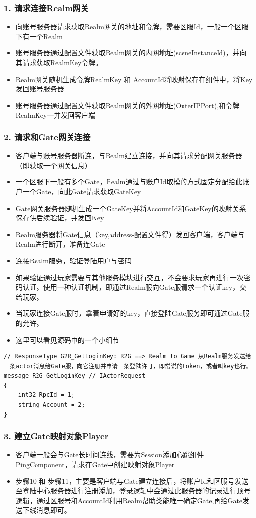 \documentclass[9pt, b5paper]{article}
\begin{document}
\subsubsection{1. 请求连接Realm网关}
\label{sec-3-2-1}
\begin{itemize}
\item 向账号服务器请求获取Realm网关的地址和令牌，需要区服Id，一般一个区服下有一个Realm
\item 账号服务器通过配置文件获取Realm网关的内网地址(sceneInstanceId)，并向其请求获取RealmKey令牌。
\item Realm网关随机生成令牌RealmKey 和 AccountId将映射保存在组件中，将Key发回账号服务器
\item 账号服务器通过配置文件获取Realm网关的外网地址(OuterIPPort),和令牌RealmKey一并发回客户端
\end{itemize}
\subsubsection{2. 请求和Gate网关连接}
\label{sec-3-2-2}
\begin{itemize}
\item 客户端与账号服务器断连，与Realm建立连接，并向其请求分配网关服务器（即获取一个网关信息）
\item 一个区服下一般有多个Gate，Realm通过与账户Id取模的方式固定分配给此账户一个Gate，向此Gate请求获取GateKey
\item Gate网关服务器随机生成一个GateKey并将AccountId和GateKey的映射关系保存供后续验证，并发回Key
\item Realm服务器将Gate信息（key,address-配置文件得）发回客户端，客户端与Realm进行断开，准备连Gate
\item 连接Realm服务，验证登陆用户与密码
\item 如果验证通过玩家需要与其他服务模块进行交互，不会要求玩家再进行一次密码认证。使用一种认证机制，即通过Realm服向Gate服请求一个认证key，交给玩家。
\item 当玩家连接Gate服时，拿着申请好的key，直接登陆Gate服务即可通过Gate服的允许。
\item 这里可以看见源码中的一个小细节
\end{itemize}
\begin{verbatim}
// ResponseType G2R_GetLoginKey: R2G ==> Realm to Game 从Realm服务发送给一条actor消息给Gate服，向它注册并申请一条登陆许可，即常说的token，或者叫key也行。
message R2G_GetLoginKey // IActorRequest
{
    int32 RpcId = 1;
    string Account = 2;
}
\end{verbatim}
\subsubsection{3. 建立Gate映射对象Player}
\label{sec-3-2-3}
\begin{itemize}
\item 客户端一般会与Gate长时间连线，需要为Session添加心跳组件PingComponent，请求在Gate中创建映射对象Player
\item 步骤10 和 步骤11，主要是客户端与Gate建立连接后，将账户Id和区服号发送至登陆中心服务器进行注册添加，登录逻辑中会通过此服务器的记录进行顶号逻辑，通过区服号和AccountId利用Realm帮助类能唯一确定Gate,再给Gate发送下线消息即可。
\end{itemize}
\end{document}
